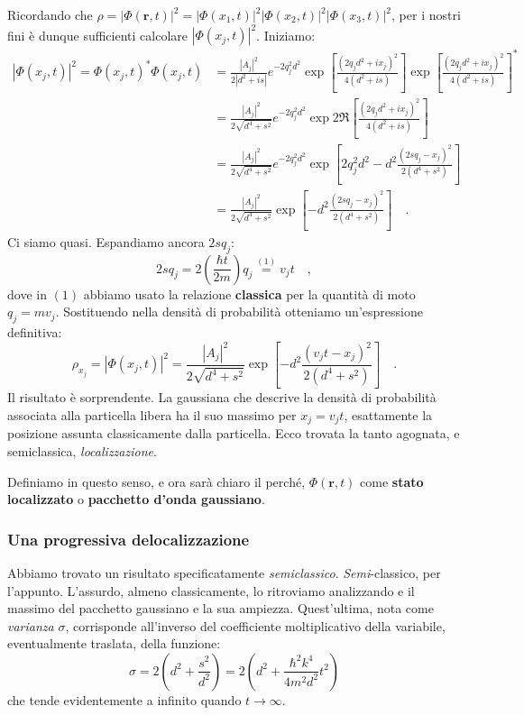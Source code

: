 Ricordando che $\rho = |\Phi(\bm{r},t)|^2 = |\Phi(x_1,t)|^2|\Phi(x_2,t)|^2|\Phi(x_3,t)|^2$, per i nostri fini è dunque sufficienti calcolare $|\Phi(x_j,t)|^2$. Iniziamo:
\[
\begin{aligned}
    |\Phi(x_j,t)|^2 = \Phi(x_j,t)^*\Phi(x_j,t) &= \frac{|A_j|^2}{{2|d^2 + is|}}e^{-2q_j^2d^2}\exp[\frac{(2q_jd^2 + ix_j)^2}{4(d^2+is)}]\exp[\frac{(2q_jd^2 + ix_j)^2}{4(d^2+is)}]^* \\
    &= \frac{|A_j|^2}{{2\sqrt{d^4+s^2}}} e^{-2q_j^2d^2} \exp{2\Re\left[\frac{(2q_jd^2 + ix_j)^2}{4(d^2+is)}\right]} \\
    &= \frac{|A_j|^2}{{2\sqrt{d^4+s^2}}} e^{-2q_j^2d^2} \exp[2q_j^2d^2 -d^2\frac{(2sq_j-x_j)^2}{2(d^4+s^2)}] \\
    &= \frac{|A_j|^2}{{2\sqrt{d^4+s^2}}} \exp[-d^2\frac{(2sq_j-x_j)^2}{2(d^4+s^2)}] \quad.
\end{aligned}
\]
Ci siamo quasi. Espandiamo ancora $2sq_j$:
\[
    2sq_j = 2\left(\frac{\hbar t}{2m}\right)q_j \overset{(1)}{=} v_j t \quad,
\]
dove in $(1)$ abbiamo usato la relazione \textbf{classica} per la quantità di moto $q_j = mv_j$. Sostituendo nella densità di probabilità otteniamo un'espressione definitiva:
\begin{equation}
    \rho_{x_j} = |\Phi(x_j,t)|^2 = \frac{|A_j|^2}{{2\sqrt{d^4+s^2}}} \exp[-d^2\frac{(v_jt-x_j)^2}{2(d^4+s^2)}] \quad.
\end{equation}
Il risultato è {sorprendente}. La gaussiana che descrive la densità di probabilità associata alla particella libera ha il suo massimo per $x_j = v_jt$, esattamente la posizione assunta classicamente dalla particella. Ecco trovata la tanto agognata, e semiclassica, \emph{localizzazione}. 

Definiamo in questo senso, e ora sarà chiaro il perché, $\Phi(\bm{r}, t)$ come \textbf{stato localizzato} o \textbf{pacchetto d'onda gaussiano}.

\subsubsection{Una progressiva delocalizzazione}
Abbiamo trovato un risultato specificatamente \emph{semiclassico}. \emph{Semi}-classico, per l'appunto. L'assurdo, almeno classicamente, lo ritroviamo analizzando e il massimo del pacchetto gaussiano e la sua ampiezza. Quest'ultima, nota come \emph{varianza} $\sigma$, corrisponde all'inverso del coefficiente moltiplicativo della variabile, eventualmente traslata, della funzione:
\[
    \sigma = 2\left( d^2 + \frac{s^2}{d^2} \right) = 2\left( d^2 + \frac{\hbar^2k^4}{4m^2d^2}t^2 \right) 
\]
che tende evidentemente a infinito quando $t \to \infty$. 

